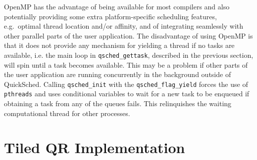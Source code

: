 \documentclass[preprint]{elsarticle}
\begin{document}
OpenMP has the advantage of being available for most compilers
and also potentially providing some extra platform-specific
scheduling features, e.g.~optimal thread location and/or affinity,
and of integrating seamlessly with other parallel parts of the
user application.
The disadvantage of using OpenMP is that it does not provide
any mechanism for yielding a thread if no tasks are available,
i.e. the main loop in {\tt qsched\_gettask}, described in the
previous section, will spin until a task becomes available.
This may be a problem if other parts of the user application
are running concurrently in the background outside of QuickSched.
Calling {\tt qsched\_init} with the {\tt qsched\_flag\_yield}
forces the use of {\tt pthreads} and uses conditional variables
to wait for a new task to be enqueued if obtaining a task
from any of the queues fails.
This relinquishes the waiting computational thread for other
processes.


\section{Tiled QR Implementation}
\end{document}
